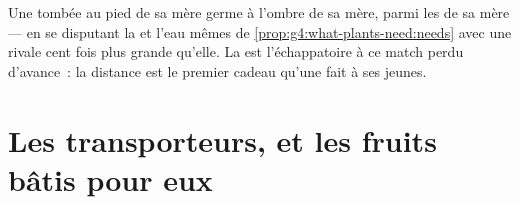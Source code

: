 \begin{example}\label{ex:g6:how-plants-spread:whyleave}
Une  tombée au pied de sa mère germe à l'ombre de sa mère,
parmi les  de sa mère --- en se disputant la  et l'eau
mêmes de \cref{prop:g4:what-plants-need:needs} avec une rivale cent
fois plus grande qu'elle. La  est l'échappatoire à ce
match perdu d'avance~: la distance est le premier cadeau qu'une
 fait à ses jeunes.
\end{example}

\section{Les transporteurs, et les fruits bâtis pour eux}


